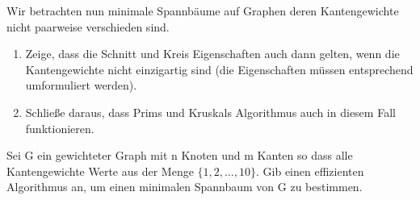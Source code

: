 \documentclass{uebung_cs}
\begin{document}
\begin{aufgabe}
	Wir betrachten nun minimale Spannbäume auf Graphen deren Kantengewichte nicht paarweise verschieden sind.
	\begin{enumerate}
		\item Zeige, dass die Schnitt und Kreis Eigenschaften auch dann gelten, wenn die Kantengewichte nicht einzigartig sind (die Eigenschaften müssen entsprechend umformuliert werden).
		\item Schließe daraus, dass Prims und Kruskals Algorithmus auch in diesem Fall funktionieren.
	\end{enumerate}
\end{aufgabe}

\begin{aufgabe}
	Sei G ein gewichteter Graph mit n Knoten und m Kanten so dass alle Kantengewichte Werte aus der Menge $\{ 1, 2, \ldots , 10\}$.
	Gib einen effizienten Algorithmus an, um einen minimalen Spannbaum von G zu bestimmen.
\end{aufgabe}
\end{document}
